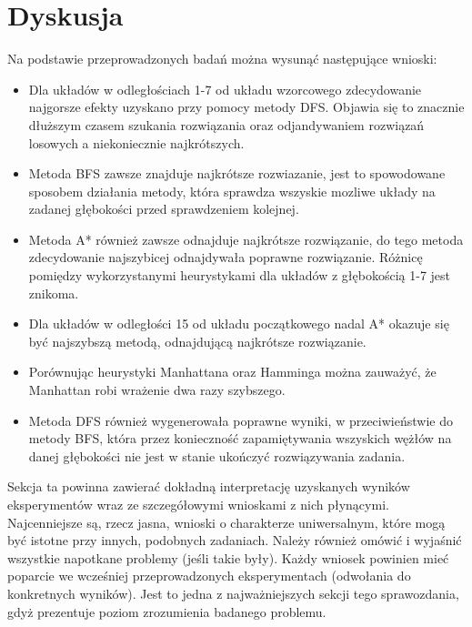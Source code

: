 \documentclass{classrep}
\begin{document}
    \section{Dyskusja}
    {

    Na podstawie przeprowadzonych badań można wysunąć następujące wnioski:
    \begin{itemize}
        \item Dla układów w odległościach 1-7 od układu wzorcowego zdecydowanie najgorsze efekty uzyskano przy pomocy metody DFS.
            Objawia się to znacznie dłuższym czasem szukania rozwiązania oraz odjandywaniem rozwiązań losowych a niekoniecznie najkrótszych.
        \item Metoda BFS zawsze znajduje najkrótsze rozwiazanie, jest to spowodowane sposobem działania metody, która
                sprawdza wszyskie mozliwe układy na zadanej głębokości przed sprawdzeniem kolejnej.
        \item Metoda A* również zawsze odnajduje najkrótsze rozwiązanie, do tego metoda zdecydowanie najszybicej odnajdywała poprawne rozwiązanie.
       Różnicę pomiędzy wykorzystanymi heurystykami dla układów z głębokością 1-7 jest znikoma.
        \item Dla układów w odległości 15 od układu początkowego nadal A* okazuje się być najszybszą metodą, odnajdującą najkrótsze rozwiązanie.
        \item Porównując heurystyki Manhattana oraz Hamminga można zauważyć, że Manhattan robi wrażenie dwa razy szybszego.
        \item Metoda DFS również wygenerowała poprawne wyniki, w przeciwieństwie do metody BFS,
            która przez konieczność zapamiętywania wszyskich wężłów na danej głębokości
            nie jest w stanie ukończyć rozwiązywania zadania.
    \end{itemize}


    Sekcja ta powinna zawierać dokładną interpretację uzyskanych wyników
    eksperymentów wraz ze szczegółowymi wnioskami z nich płynącymi. Najcenniejsze
    są, rzecz jasna, wnioski o charakterze uniwersalnym, które mogą być istotne
    przy innych, podobnych zadaniach. Należy również omówić i wyjaśnić wszystkie
    napotkane problemy (jeśli takie były). Każdy wniosek powinien mieć poparcie we
    wcześniej przeprowadzonych eksperymentach (odwołania do konkretnych wyników).
    Jest to jedna z najważniejszych sekcji tego sprawozdania, gdyż prezentuje
    poziom zrozumienia badanego problemu.}
\end{document}

